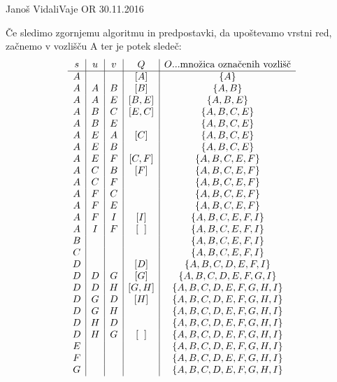 \begin{naloga}{Janoš Vidali}{Vaje OR 30.11.2016}
\begin{odgovor}
\begin{small}
\begin{algorithmic}
\end{algorithmic}
\end{small}
%
Če sledimo zgornjemu algoritmu in predpostavki, da upoštevamo vrstni red, začnemo v vozlišču A ter je potek sledeč: \\
$$
\begin{array}{c|c|c|c|c}
s & u & v & Q & O \text{...množica označenih vozlišč} \\ \hline
A &   &   & [A]  & \{A\} \\
A & A & B & [B] & \{A, B\} \\
A & A & E & [B, E] & \{A, B, E\} \\
A & B & C & [E, C] & \{A, B, C, E\} \\
A & B  & E &  & \{A, B, C, E\} \\
A & E & A & [C] & \{A, B, C, E\} \\
A & E & B &  & \{A, B, C, E\} \\
A & E & F & [C, F] & \{A, B, C, E, F\} \\
A & C  & B & [F] &  \{A, B, C, E, F\} \\
A & C & F &  &  \{A, B, C, E, F\} \\
A & F & C &  &  \{A, B, C, E, F\} \\
A & F  & E &  &  \{A, B, C, E, F\} \\
A & F & I & [I] &  \{A, B, C, E, F, I\} \\
A & I  & F & [\hspace{0.2cm} ] &  \{A, B, C, E, F, I\} \\
B & & & &  \{A, B, C, E, F, I\} \\
C & & & &  \{A, B, C, E, F, I\} \\
D & & & [D] &  \{A, B, C, D, E, F, I\} \\
D &D &G &[G] &  \{A, B, C, D, E, F, G, I\} \\
D &D &H &[G, H] &  \{A, B, C, D, E, F, G, H, I\} \\
D &G &D &[H] &  \{A, B, C, D, E, F, G, H, I\} \\
D &G &H & &  \{A, B, C, D, E, F, G, H, I\} \\
D &H &D & &  \{A, B, C, D, E, F, G, H, I\} \\
D &H &G &  [\hspace{0.2cm} ]&  \{A, B, C, D, E, F, G, H, I\} \\
E & & & &  \{A, B, C, D, E, F, G, H, I\} \\
F & & & &  \{A, B, C, D, E, F, G, H, I\} \\
G & & & &  \{A, B, C, D, E, F, G, H, I\} \\

\end{array}$$
\end{odgovor}
\end{naloga}
